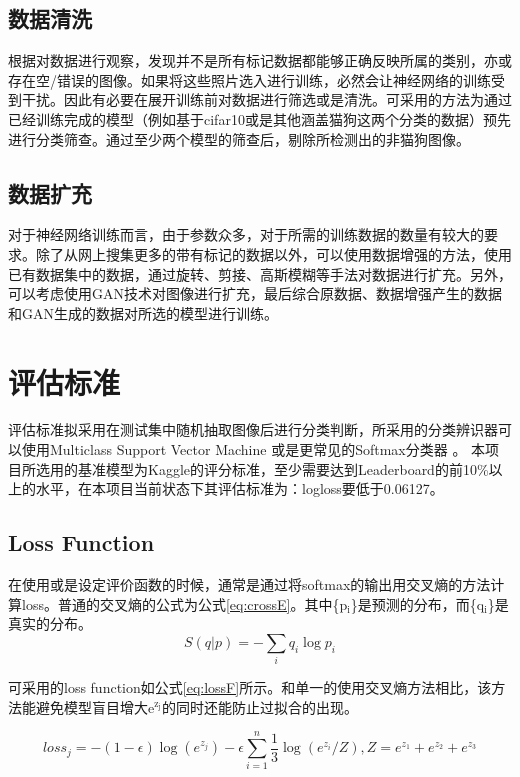\documentclass[a4paper,11pt]{article}
\begin{document}
\subsection{数据清洗}
\label{sec:orgef49ea3}
根据对数据进行观察，发现并不是所有标记数据都能够正确反映所属的类别，亦或存在空/错误的图像。如果将这些照片选入进行训练，必然会让神经网络的训练受到干扰。因此有必要在展开训练前对数据进行筛选或是清洗。可采用的方法为通过已经训练完成的模型（例如基于cifar10或是其他涵盖猫狗这两个分类的数据）预先进行分类筛查。通过至少两个模型的筛查后，剔除所检测出的非猫狗图像。

\subsection{数据扩充}
\label{sec:org78a5802}
对于神经网络训练而言，由于参数众多，对于所需的训练数据的数量有较大的要求。除了从网上搜集更多的带有标记的数据以外，可以使用数据增强的方法，使用已有数据集中的数据，通过旋转、剪接、高斯模糊等手法对数据进行扩充。另外，可以考虑使用GAN技术对图像进行扩充，最后综合原数据、数据增强产生的数据和GAN生成的数据对所选的模型进行训练。

\section{评估标准}
\label{sec:orgc29b8e9}
评估标准拟采用在测试集中随机抽取图像后进行分类判断，所采用的分类辨识器可以使用Multiclass Support Vector Machine \cite{Kung2014} 或是更常见的Softmax分类器 \cite{QiWangLiu2017}。 本项目所选用的基准模型为Kaggle的评分标准，至少需要达到Leaderboard的前10\%以上的水平，在本项目当前状态下其评估标准为：logloss要低于0.06127。

\subsection{Loss Function}
\label{sec:org454f235}
在使用或是设定评价函数的时候，通常是通过将softmax的输出用交叉熵的方法计算loss。普通的交叉熵的公式为公式\ref{eq:crossE}。其中\{p\(_{\text{i}}\)\}是预测的分布，而\{q\(_{\text{i}}\)\}是真实的分布。
\begin{equation}
\label{eq:crossE}
S(q|p) = -\sum_i q_i \log{p_i}
\end{equation}

可采用的loss function如公式\ref{eq:lossF}所示。和单一的使用交叉熵方法相比，该方法能避免模型盲目增大e\(^{\text{z}_{\text{j}}}\)的同时还能防止过拟合的出现。

\begin{equation}
\label{eq:lossF}
loss_j = - (1-\epsilon)\log{(e^{z_j})} - \epsilon \sum_{i=1}^n \frac{1}{3} \log{(e^{z_i}/Z)}, Z=e^{z_1}+ e^{z_2}+e^{z_3}
\end{equation}
\end{document}
